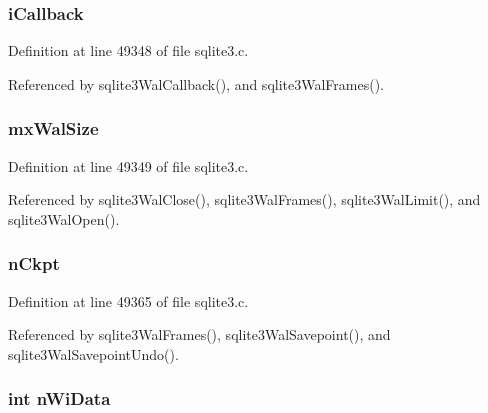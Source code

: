 \hypertarget{struct_wal_adfec8c5d31fed9aa5fcd3e9a4b576645}{}
\subsubsection[{i\+Callback}]{ i\+Callback}\label{struct_wal_adfec8c5d31fed9aa5fcd3e9a4b576645}


Definition at line 49348 of file sqlite3.\+c.



Referenced by sqlite3\+Wal\+Callback(), and sqlite3\+Wal\+Frames().

\hypertarget{struct_wal_abb75a5d3d5d1f85ef95bf88712fc4682}{}
\subsubsection[{mx\+Wal\+Size}]{ mx\+Wal\+Size}\label{struct_wal_abb75a5d3d5d1f85ef95bf88712fc4682}


Definition at line 49349 of file sqlite3.\+c.



Referenced by sqlite3\+Wal\+Close(), sqlite3\+Wal\+Frames(), sqlite3\+Wal\+Limit(), and sqlite3\+Wal\+Open().

\hypertarget{struct_wal_aecbfeebc7a36d1a384f77380aafce538}{}
\subsubsection[{n\+Ckpt}]{ n\+Ckpt}\label{struct_wal_aecbfeebc7a36d1a384f77380aafce538}


Definition at line 49365 of file sqlite3.\+c.



Referenced by sqlite3\+Wal\+Frames(), sqlite3\+Wal\+Savepoint(), and sqlite3\+Wal\+Savepoint\+Undo().

\hypertarget{struct_wal_a488fc6fabac12f933024f02806a1d326}{}
\subsubsection[{n\+Wi\+Data}]{\setlength{\rightskip}{0pt plus 5cm}int n\+Wi\+Data}\label{struct_wal_a488fc6fabac12f933024f02806a1d326}


